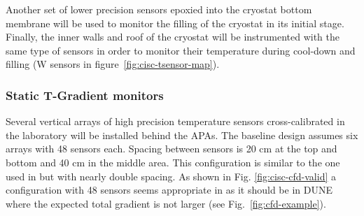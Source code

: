

Another set of lower precision sensors epoxied into the cryostat bottom membrane will be used to monitor the filling of the cryostat in its initial stage.   
Finally, the inner walls and roof of the cryostat will be instrumented with the same type of sensors in order to monitor their temperature during cool-down and filling (W sensors in figure~\ref{fig:cisc-tsensor-map}).
 
 

\subsubsection{Static T-Gradient monitors}

Several vertical arrays of high precision temperature sensors cross-calibrated in the laboratory will be installed behind the APAs.  
The baseline design assumes six arrays with 48 sensors each. Spacing between sensors
is 20 cm at the top and bottom and 40 cm in the middle area. This configuration is similar to the one used in  but with nearly double spacing. As shown in Fig. \ref{fig:cisc-cfd-valid} a configuration with 48 sensors seems appropriate in  as it should be in DUNE where the expected total gradient is not larger (see Fig.~\ref{fig:cfd-example}). 

